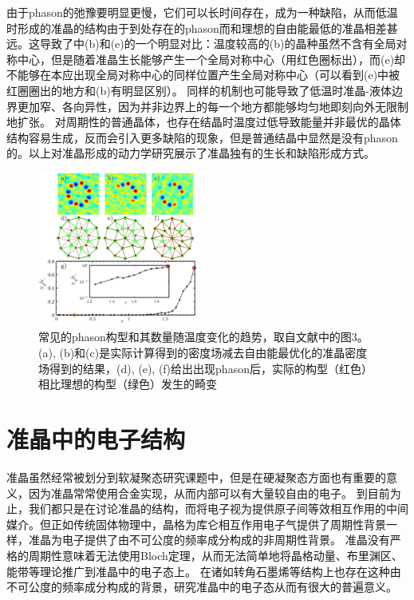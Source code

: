 \documentclass[hyperref, UTF8, a4paper]{ctexart}
\begin{document}
由于phason的弛豫要明显更慢，它们可以长时间存在\cite{PhysRevB.32.7444}，成为一种缺陷，从而低温时形成的准晶的结构由于到处存在的phason而和理想的自由能最低的准晶相差甚远。这导致了中(b)和(e)的一个明显对比：温度较高的(b)的晶种虽然不含有全局对称中心，但是随着准晶生长能够产生一个全局对称中心（用红色圈标出），而(e)却不能够在本应出现全局对称中心的同样位置产生全局对称中心（可以看到(e)中被红圈圈出的地方和(b)有明显区别）。
同样的机制也可能导致了低温时准晶-液体边界更加窄、各向异性，因为并非边界上的每一个地方都能够均匀地即刻向外无限制地扩张。
对周期性的普通晶体，也存在结晶时温度过低导致能量并非最优的晶体结构容易生成，反而会引入更多缺陷的现象\cite{2018fox}，但是普通结晶中显然是没有phason的。以上对准晶形成的动力学研究展示了准晶独有的生长和缺陷形成方式。

\begin{figure}
    \centering
    \includegraphics[width=0.5\textwidth]{phason.png}
    \caption{常见的phason构型和其数量随温度变化的趋势，取自文献\cite{PhysRevLett.112.255501}中的图3。(a), (b)和(c)是实际计算得到的密度场减去自由能最优化的准晶密度场得到的结果，(d), (e), (f)给出出现phason后，实际的构型（红色）相比理想的构型（绿色）发生的畸变}
\end{figure}

\section{准晶中的电子结构}\label{sec:electron}

准晶虽然经常被划分到软凝聚态研究课题中，但是在硬凝聚态方面也有重要的意义，因为准晶常常使用合金实现，从而内部可以有大量较自由的电子。
到目前为止，我们都只是在讨论准晶的结构，而将电子视为提供原子间等效相互作用的中间媒介。但正如传统固体物理中，晶格为库仑相互作用电子气提供了周期性背景一样，准晶为电子提供了由不可公度的频率成分构成的非周期性背景。
准晶没有严格的周期性意味着无法使用Bloch定理，从而无法简单地将晶格动量、布里渊区、能带等理论推广到准晶中的电子态上。
在诸如转角石墨烯等结构上也存在这种由不可公度的频率成分构成的背景，研究准晶中的电子态从而有很大的普遍意义。
\end{document}
